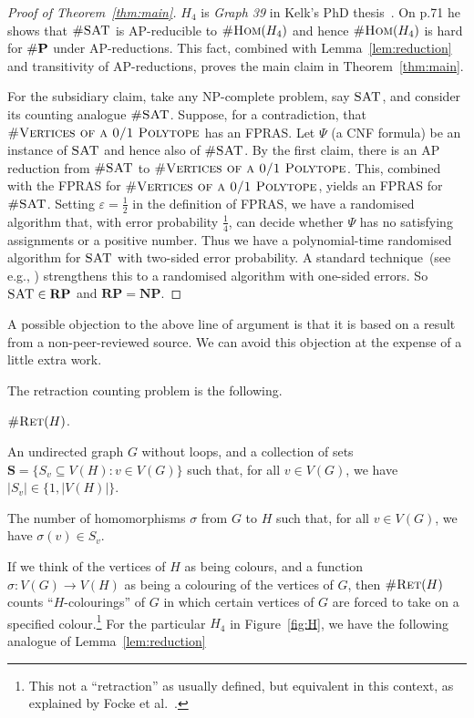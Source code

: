 \documentclass[11pt, oneside]{article}   	%
\def\NP{\ensuremath{\mathbf{NP}}}
\def\RP{\ensuremath{\mathbf{RP}}}
\def\numP{\textup{\#}\mathbf{P}}
\def\bfS{\mathbf S}
\def\SAT{\textsc{SAT}}
\def\nSAT{\textsc{\#SAT}}
\def\nRet{\textsc{\#Ret}}
\def\nHom{\textsc{\#Hom}}
\def\nPolytopeVertices{\textsc{\#Vertices of a 0/1 Polytope}}
\let\epsilon=\varepsilon
\def\Hfour{H_4}
\begin{document}
\begin{proof}[Proof of Theorem~\ref{thm:main}]
$H_4$ is \textit{Graph 39} in Kelk's PhD thesis~\cite{KelkThesis}. On p.71 he shows that $\nSAT$ is AP-reducible to $\nHom(\Hfour)$ and hence $\nHom(\Hfour)$ is hard for $\numP$ under AP-reductions. This fact, combined with Lemma~\ref{lem:reduction} and transitivity of AP-reductions, proves the main claim in Theorem~\ref{thm:main}.

For the subsidiary claim, take any NP-complete problem, say $\SAT$, and consider its counting analogue $\nSAT$.  Suppose, for a contradiction, that $\nPolytopeVertices$ has an FPRAS.  Let $\Psi$ (a CNF formula) be an instance of $\SAT$ and hence also of $\nSAT$.  By the first claim, there is an AP reduction from $\nSAT$ to $\nPolytopeVertices$.  This, combined with the FPRAS for  $\nPolytopeVertices$, yields an FPRAS for $\nSAT$.  Setting $\epsilon=\frac12$ in the definition of FPRAS, we have a randomised algorithm that, with error probability $\frac14$, can decide whether $\Psi$ has no satisfying assignments or a positive number.  Thus we have a polynomial-time randomised algorithm for $\SAT$ with two-sided error probability.  A standard technique~(see e.g., \cite[Ex 1.15]{MR95}) strengthens this to a randomised algorithm with one-sided errors.  So $\SAT\in\RP$ and $\RP=\NP$.
\end{proof}

A possible objection to the above line of argument is that it is based on a result from a non-peer-reviewed source.  We can avoid this objection at the expense of a little extra work.

The retraction counting problem is the following. 
\begin{description}[itemsep=0pt]
\item [Problem:] $\nRet(H)$.
\item [Instance:] An undirected graph $G$ without loops, and a collection of sets $\bfS=\{S_v\subseteq V(H):v\in V(G)\}$ such that, for all $v\in V(G)$, we have $|S_v|\in\{1,|V(H)|\}$.  
\item [Output:] The number of homomorphisms $\sigma$ from $G$ to $H$ such that, for all $v\in V(G)$, we have $\sigma(v)\in S_v$.
\end{description}

If we think of the vertices of $H$ as being colours, and a function $\sigma:V(G)\to V(H)$ as being a colouring of the vertices of $G$, then $\nRet(H)$ counts ``$H$-colourings'' of $G$ in which certain vertices of $G$ are forced to take on a specified colour.\footnote{This not a ``retraction'' as usually defined, but equivalent in this context, as explained by Focke et al.~\cite{FGZ21}.} For the particular $\Hfour$ in Figure~\ref{fig:H}, we have the following analogue of Lemma~\ref{lem:reduction}
\end{document}
